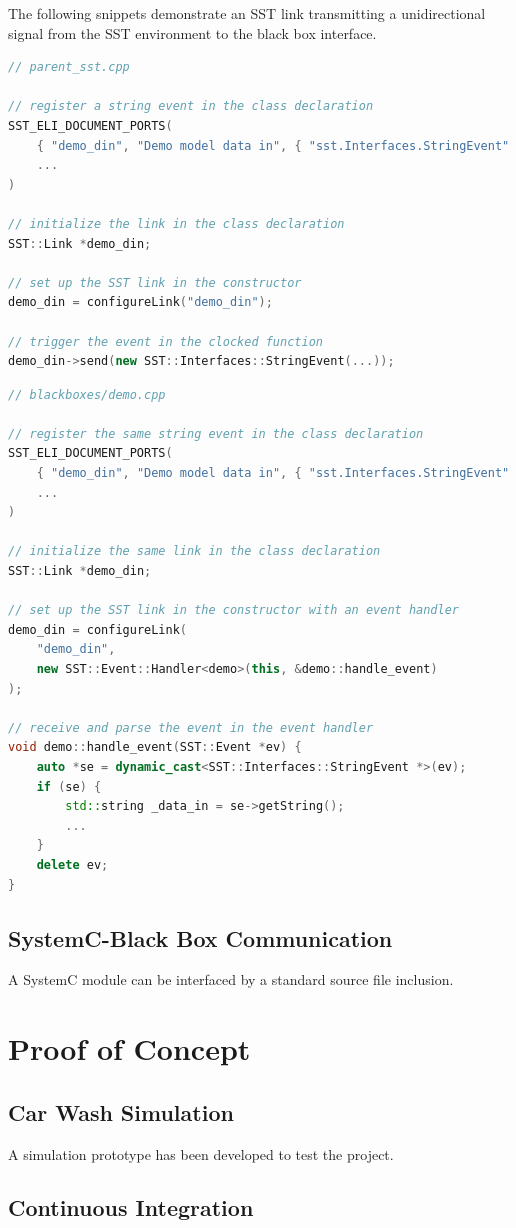 \documentclass{article}
\begin{document}
    The following snippets demonstrate an SST link transmitting a unidirectional signal from the SST environment to the black box interface.

\begin{lstlisting}[language=C++]
// parent_sst.cpp

// register a string event in the class declaration
SST_ELI_DOCUMENT_PORTS(
    { "demo_din", "Demo model data in", { "sst.Interfaces.StringEvent" }},
    ...
)

// initialize the link in the class declaration
SST::Link *demo_din;

// set up the SST link in the constructor
demo_din = configureLink("demo_din");

// trigger the event in the clocked function
demo_din->send(new SST::Interfaces::StringEvent(...));
\end{lstlisting}

\begin{lstlisting}[language=C++]
// blackboxes/demo.cpp

// register the same string event in the class declaration
SST_ELI_DOCUMENT_PORTS(
    { "demo_din", "Demo model data in", { "sst.Interfaces.StringEvent" }},
    ...
)

// initialize the same link in the class declaration
SST::Link *demo_din;

// set up the SST link in the constructor with an event handler
demo_din = configureLink(
    "demo_din",
    new SST::Event::Handler<demo>(this, &demo::handle_event)
);

// receive and parse the event in the event handler
void demo::handle_event(SST::Event *ev) {
    auto *se = dynamic_cast<SST::Interfaces::StringEvent *>(ev);
    if (se) {
        std::string _data_in = se->getString();
        ...
    }
    delete ev;
}
\end{lstlisting}

    \subsection{SystemC-Black Box Communication}
    A SystemC module can be interfaced by a standard source file inclusion.

  \section{Proof of Concept}

    \subsection{Car Wash Simulation}
    A simulation prototype has been developed to test the project.

    \subsection{Continuous Integration}
\end{document}

